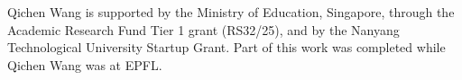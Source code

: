 \documentclass[acmsmall,authorversion,dvipsnames]{acmart}
\begin{document}








\begin{acks}
Qichen Wang is supported by the Ministry of Education, Singapore, through the Academic Research Fund Tier 1 grant (RS32/25), and by the Nanyang Technological University Startup Grant. Part of this work was completed while Qichen Wang was at EPFL. 
\end{acks}





\clearpage
{}
\newpage
\appendix





\end{document}
